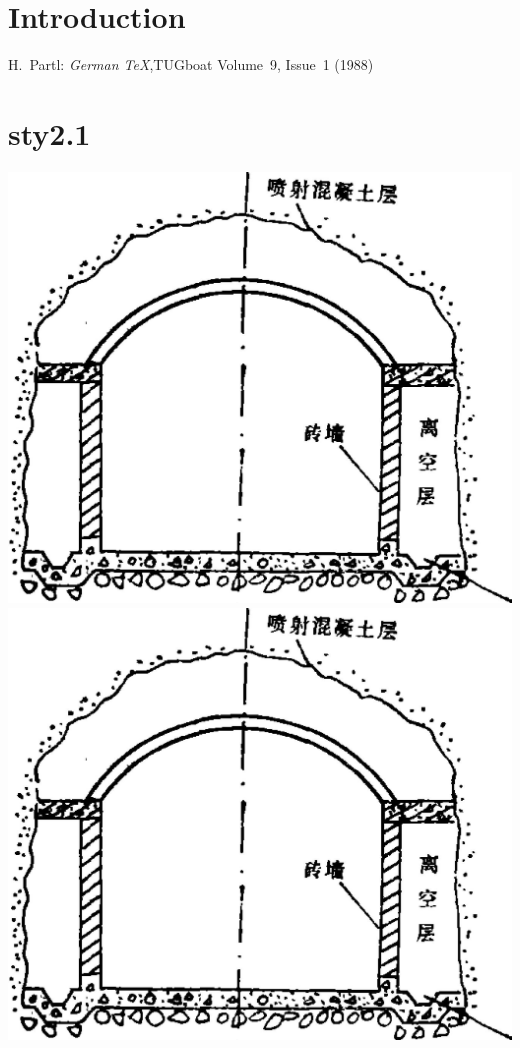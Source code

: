 \documentclass{article}%
\begin{document}
 

\section{Introduction}%



\begin{thebibliography}{99}
 H.~Partl: \emph{German \TeX},TUGboat Volume~9, Issue~1 (1988)
\end{thebibliography}


\section{sty2.1}%


\begin{multicols}{2}
\includegraphics[scale=1]{tu1.jpg}
\includegraphics[scale=1]{tu1.jpg}
\end{multicols}
\end{document}

